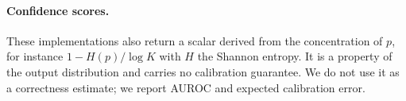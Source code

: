 \paragraph{Confidence scores.} These implementations also return a scalar
derived from the concentration of $p$, for instance $1 - H(p)/\log K$ with $H$
the Shannon entropy. It is a property of the output distribution and carries no
calibration guarantee. We do not use it as a correctness estimate; we report
AUROC and expected calibration error.
